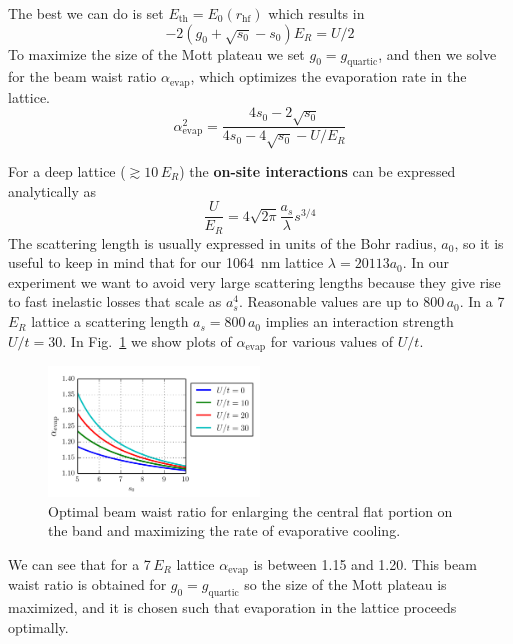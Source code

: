 \documentclass[11pt,letter]{article}
\begin{document}
The best we can do is set  $E_{\text{th}}= E_{0}(r_{\text{hf}}) $ which
results in
\begin{equation}
  -2( g_{0} + \sqrt{s_{0}} - s_{0} ) E_{R} = U/2  
\end{equation}  
To maximize the size of the Mott plateau we set $g_{0} = g_{\text{quartic}}$,
and then we solve for the beam waist ratio $\alpha_{\text{evap}}$, which
optimizes the evaporation rate in the lattice. 
\begin{equation}
 \alpha_{\text{evap}}^{2} =  \frac{ 4 s_{0} - 2 \sqrt{s_{0} }}
    { 4s_{0} - 4 \sqrt{s_{0}}  - U/E_{R} }  
\end{equation} 
 
For a deep lattice ($\gtrsim 10\,E_{R}$) the \textbf{on-site interactions}
can be expressed analytically as 
\begin{equation}
  \frac{U}{E_{R}}  =  4 \sqrt{2\pi} \frac{ a_{s} }{\lambda}  s^{3/4} 
  \label{eq:onsite-analytic}
\end{equation} 
The scattering length is usually expressed in units of the Bohr radius,
$a_{0}$, so it is useful to keep in mind that for our 1064~nm lattice
$\lambda = 20113 a_{0}$.  In our experiment we want to avoid very large
scattering lengths because they give rise to fast inelastic losses that scale
as $a_{s}^{4}$.   Reasonable values are up to 800\,$a_{0}$.   In a 7\,$E_{R}$
lattice a scattering length $a_{s}=800\,a_{0}$ implies an interaction
strength $U/t=30$.   In Fig.~\ref{fig:alpha-evap-optimal} we show plots of
$\alpha_{\text{evap}}$ for various values of $U/t$.   
\begin{figure}
    \centering
\includegraphics[width=0.5\textwidth]{figures/alpha-evap-optimal.png}
\caption{Optimal beam waist ratio for enlarging the central flat portion on
the band and maximizing the rate of evaporative cooling. }
\label{fig:alpha-evap-optimal}
\end{figure}

We can see that for a 7\,$E_{R}$ lattice $\alpha_{\text{evap}}$ is
between 1.15 and 1.20.  This beam waist ratio is obtained for
$g_{0}=g_{\text{quartic}}$ so the size of the Mott plateau is maximized, and
it is chosen such that evaporation in the lattice proceeds optimally. 
\end{document}
